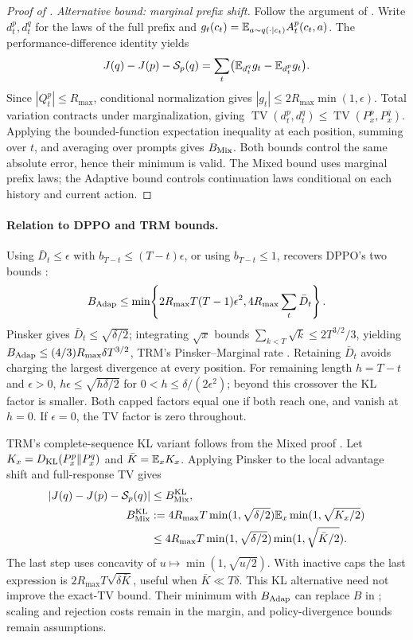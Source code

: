 \begin{proof}[Proof of ]
\emph{Alternative bound: marginal prefix shift.} Follow the argument of
\citet[Appendix~C.2]{li2025trm}. Write $d_t^p,d_t^q$ for the laws of the full prefix and
$g_t(c_t)=\mathbb{E}_{a\sim q(\cdot\mid c_t)}A_t^p(c_t,a)$.
The performance-difference identity yields
\[
 J(q)-J(p)-\mathcal S_p(q)
 =\sum_t\bigl(\mathbb{E}_{d_t^q}g_t-\mathbb{E}_{d_t^p}g_t\bigr).
\]
Since $|Q_t^p|\le R_{\max}$, conditional normalization gives
$|g_t|\le2R_{\max}\min(1,\epsilon)$.
Total variation contracts under marginalization, giving
$\operatorname{TV}(d_t^p,d_t^q)\le\operatorname{TV}(P_x^p,P_x^q)$.
Applying the bounded-function expectation inequality at each position,
summing over $t$, and averaging over prompts gives $B_{\rm Mix}$.
Both bounds control the same absolute error, hence their minimum is valid.
The Mixed bound uses marginal prefix laws; the Adaptive bound controls
continuation laws conditional on each history and current action.
\end{proof}

\paragraph{Relation to DPPO and TRM bounds.}
Using $\bar D_t\le\epsilon$ with $b_{T-t}\le(T-t)\epsilon$, or
using $b_{T-t}\le1$, recovers DPPO's two bounds
\citep[Appendix~B.2--B.3]{qi2026rethinkingtrustregionllm}:
\[
 B_{\rm Adap}\le\min\!\left\{2R_{\max}T(T-1)\epsilon^2,
                                 4R_{\max}\sum_t\bar D_t\right\}.
\]
Pinsker gives $\bar D_t\le\sqrt{\delta/2}$; integrating $\sqrt{x}$
bounds $\sum_{k<T}\sqrt{k}\le2T^{3/2}/3$, yielding
$B_{\rm Adap}\le(4/3)R_{\max}\delta T^{3/2}$, TRM's
Pinsker--Marginal rate \citep{li2025trm}. Retaining $\bar D_t$ avoids
charging the largest divergence at every position. For remaining length
$h=T-t$ and $\epsilon>0$, $h\epsilon\le\sqrt{h\delta/2}$ for
$0<h\le\delta/(2\epsilon^2)$; beyond this crossover the KL factor is
smaller. Both capped factors equal one if both reach one, and vanish at
$h=0$. If $\epsilon=0$, the TV factor is zero throughout.

TRM's complete-sequence KL variant follows from the Mixed proof
\citep[Appendix~C.2]{li2025trm}. Let
$K_x=D_{\rm KL}(P_x^p\|P_x^q)$ and $\bar K=\mathbb{E}_xK_x$.
Applying Pinsker to the local advantage shift and full-response TV gives
\begin{align*}
 |J(q)-J(p)-\mathcal S_p(q)|&\le B_{\rm Mix}^{\rm KL},\\
 B_{\rm Mix}^{\rm KL}&:=4R_{\max}T\min(1,\sqrt{\delta/2})
                         \mathbb{E}_x\min(1,\sqrt{K_x/2})\\
 &\le4R_{\max}T\min(1,\sqrt{\delta/2})\min(1,\sqrt{\bar K/2}).
\end{align*}
The last step uses concavity of $u\mapsto\min(1,\sqrt{u/2})$.
With inactive caps the last expression is $2R_{\max}T\sqrt{\delta\bar K}$,
useful when $\bar K\ll T\delta$. This KL alternative need not improve
the exact-TV bound. Their minimum with $B_{\rm Adap}$ can replace $B$
in ; scaling and rejection costs remain in
the margin, and policy-divergence bounds remain assumptions.

